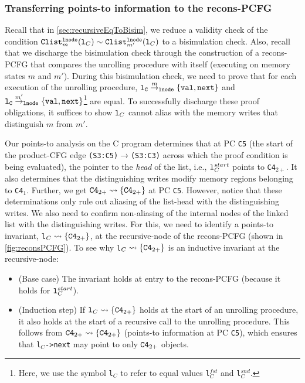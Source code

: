 \subsubsection{Transferring points-to information to the recons-PCFG}
\label{sec:pointsToAsInvariants}
Recall that
in \cref{sec:recursiveEqToBisim},
we reduce a validity check of the condition
${\tt Clist}_m^{{\tt lnode}}({\tt l}_C)
\sim{} {\tt Clist}_{m'}^{{\tt lnode}}({\tt l}_C)$
to a bisimulation check. Also, recall
that we discharge the bisimulation check through the construction
of a recons-PCFG that compares the unrolling procedure with itself (executing
on memory states $m$ and $m'$).
During this bisimulation check, we need to prove
that for each execution
of the unrolling procedure, ${\tt {\tt l}_C} \overset{m}{\rightarrow}_{\tt lnode} {\tt \{val,next\}}$
and ${\tt {\tt l}_C} \overset{m'}{\rightarrow}_{\tt lnode} {\tt \{val,next\}}$\footnote{Here, we use the symbol {\tt l}$_C$ to
refer to equal values {\tt l}$^{fst}_C$ and
{\tt l}$^{snd}_C$.} are equal.
To successfully discharge these proof obligations, it suffices
to show ${\tt l}_C$ cannot alias with the memory writes that
distinguish $m$ from $m'$.

Our points-to analysis on
the C program determines that at PC {\tt C5} (the start of
the product-CFG edge {\tt (S3:C5)$\rightarrow$(S3:C3)} across which the proof
condition is being evaluated),
the pointer to the {\em head}
of the list, i.e., ${\tt l}^{start}_C$
points to {\tt C4}$_{2+}$. It also determines that the distinguishing
writes modify memory regions belonging to {\tt C4}$_1$. 
Further, we get ${\tt C4}_{2+}\rightsquigarrow{}\{{\tt C4}_{2+}\}$ at PC {\tt C5}.
However,
notice that these determinations only rule out aliasing of the list-head with
the distinguishing writes. We also need to confirm non-aliasing
of the internal nodes of the linked list with the distinguishing
writes.
For this, we need to identify a points-to invariant,
{\tt l}$_C\rightsquigarrow{}\{{\tt C4}_{2+}\}$, at the recursive-node
of the recons-PCFG
(shown in \cref{fig:reconsPCFG}).
To see why {\tt l}$_C\rightsquigarrow{}\{{\tt C4}_{2+}\}$ is
an inductive invariant at the recursive-node:
\begin{itemize}
\item (Base case) The invariant holds
at entry to the recons-PCFG (because it holds for ${\tt l}^{start}_C$).
\item (Induction step) If ${\tt l}_C\rightsquigarrow{}\{{\tt C4}_{2+}\}$
holds at the start of an unrolling procedure,
it also holds at the start of a recursive call to the
unrolling procedure. This
follows from ${\tt C4}_{2+}\rightsquigarrow{}\{{\tt C4}_{2+}\}$ (points-to information at PC {\tt C5}),
which ensures that {\tt l$_C$->next} may point to only ${\tt C4}_{2+}$ objects.
\end{itemize}

